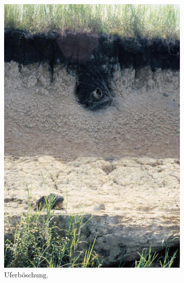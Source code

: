 \begin{figure}[!tb]
\begin{subfigure}[t]{0.32\textwidth}
		\includegraphics[width = \textwidth]{fig/LKW87-186_E87-047-3.jpg}
		\caption{Uferböschung.}
		\label{fig:LKW87_186_Foto}
	\end{subfigure}\hfill
	\begin{subfigure}[t]{0.32\textwidth}
		\centering

\end{subfigure}
\end{figure}
